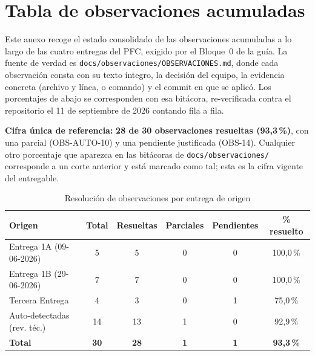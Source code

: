 
\chapter{Tabla de observaciones acumuladas}
\label{anexo:a}

Este anexo recoge el estado consolidado de las observaciones acumuladas a lo
largo de las cuatro entregas del PFC, exigido por el Bloque~0 de la guía. La
fuente de verdad es \texttt{docs/observaciones/OBSERVACIONES.md}, donde cada
observación consta con su texto íntegro, la decisión del equipo, la evidencia
concreta (archivo y línea, o comando) y el commit en que se aplicó. Los
porcentajes de abajo se corresponden con esa bitácora, re-verificada contra el
repositorio el 11 de septiembre de 2026 contando fila a fila.

\textbf{Cifra única de referencia:} \textbf{28 de 30 observaciones
resueltas (93,3\,\%)}, con una parcial (OBS-AUTO-10) y una pendiente
justificada (OBS-14). Cualquier otro porcentaje que aparezca en las
bitácoras de \texttt{docs/observaciones/} corresponde a un corte anterior
y está marcado como tal; esta es la cifra vigente del entregable.

\begin{table}[H]
\centering
\caption{Resolución de observaciones por entrega de origen}
\label{tab:observaciones-por-entrega}
\small
\begin{tabular}{@{}p{3.6cm}ccccc@{}}
\toprule
\textbf{Origen} & \textbf{Total} & \textbf{Resueltas} & \textbf{Parciales} &
\textbf{Pendientes} & \textbf{\% resuelto} \\
\midrule
Entrega 1A (09-06-2026)      & 5  & 5  & 0 & 0 & 100,0\,\% \\
Entrega 1B (29-06-2026)      & 7  & 7  & 0 & 0 & 100,0\,\% \\
Tercera Entrega              & 4  & 3  & 0 & 1 & 75,0\,\% \\
Auto-detectadas (rev. téc.)  & 14 & 13 & 1 & 0 & 92,9\,\% \\
\midrule
\textbf{Total}               & \textbf{30} & \textbf{28} & \textbf{1} &
\textbf{1} & \textbf{93,3\,\%} \\
\bottomrule
\end{tabular}
\end{table}

